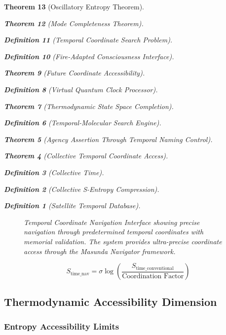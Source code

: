 \documentclass[12pt,a4paper]{article}
\newtheorem{theorem}{Theorem}[section]
\newtheorem{definition}[theorem]{Definition}
\begin{document}
\begin{theorem}[Oscillatory Entropy Theorem]
\begin{theorem}[Mode Completeness Theorem]
\begin{enumerate}
\begin{definition}[Temporal Coordinate Search Problem]
\begin{algorithm}
\begin{definition}[Fire-Adapted Consciousness Interface]
\begin{theorem}[Future Coordinate Accessibility]
\begin{definition}[Virtual Quantum Clock Processor]
\begin{itemize}
\begin{itemize}
\begin{theorem}[Thermodynamic State Space Completion]
\begin{definition}[Temporal-Molecular Search Engine]
\begin{theorem}[Agency Assertion Through Temporal Naming Control]
\begin{remark}
\begin{theorem}[Collective Temporal Coordinate Access]
\begin{definition}[Collective Time]
\begin{definition}[Collective S-Entropy Compression]
\begin{definition}[Satellite Temporal Database]
\begin{algorithm}
\begin{table}[h]
{{\begin{figure}[H]
\caption{Temporal Coordinate Navigation Interface showing precise navigation through predetermined temporal coordinates with memorial validation. The system provides ultra-precise coordinate access through the Masunda Navigator framework.}
\label{fig:temporal_navigation_interface}
\end{figure}

\begin{equation}
S_{\text{time\_nav}} = \sigma \log\left(\frac{S_{\text{time\_conventional}}}{\text{Coordination Factor}}\right)
\label{eq:temporal_navigation}
\end{equation}

\subsection{Thermodynamic Accessibility Dimension}

\subsubsection{Entropy Accessibility Limits}

}}
\end{table}
\end{algorithm}
\end{definition}
\end{definition}
\end{definition}
\end{theorem}
\end{remark}
\end{theorem}
\end{definition}
\end{theorem}
\end{itemize}
\end{itemize}
\end{definition}
\end{theorem}
\end{definition}
\end{algorithm}
\end{definition}
\end{enumerate}
\end{theorem}
\end{theorem}
\end{document}
